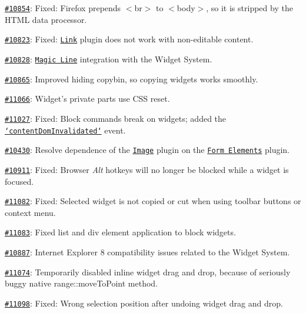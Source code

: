 \begin{DoxyItemize}
\item \href{http://dev.ckeditor.com/ticket/10854}{\tt \#10854}\-: Fixed\-: Firefox prepends {\ttfamily $<$br$>$} to {\ttfamily $<$body$>$}, so it is stripped by the H\-T\-M\-L data processor.
\item \href{http://dev.ckeditor.com/ticket/10823}{\tt \#10823}\-: Fixed\-: \href{http://ckeditor.com/addon/link}{\tt Link} plugin does not work with non-\/editable content.
\item \href{http://dev.ckeditor.com/ticket/10828}{\tt \#10828}\-: \href{http://ckeditor.com/addon/magicline}{\tt Magic Line} integration with the Widget System.
\item \href{http://dev.ckeditor.com/ticket/10865}{\tt \#10865}\-: Improved hiding copybin, so copying widgets works smoothly.
\item \href{http://dev.ckeditor.com/ticket/11066}{\tt \#11066}\-: Widget's private parts use C\-S\-S reset.
\item \href{http://dev.ckeditor.com/ticket/11027}{\tt \#11027}\-: Fixed\-: Block commands break on widgets; added the \href{http://docs.ckeditor.com/#!/api/CKEDITOR.editor-event-contentDomInvalidated}{\tt `content\-Dom\-Invalidated`} event.
\item \href{http://dev.ckeditor.com/ticket/10430}{\tt \#10430}\-: Resolve dependence of the \href{http://ckeditor.com/addon/image}{\tt Image} plugin on the \href{http://ckeditor.com/addon/forms}{\tt Form Elements} plugin.
\item \href{http://dev.ckeditor.com/ticket/10911}{\tt \#10911}\-: Fixed\-: Browser {\itshape Alt} hotkeys will no longer be blocked while a widget is focused.
\item \href{http://dev.ckeditor.com/ticket/11082}{\tt \#11082}\-: Fixed\-: Selected widget is not copied or cut when using toolbar buttons or context menu.
\item \href{http://dev.ckeditor.com/ticket/11083}{\tt \#11083}\-: Fixed list and div element application to block widgets.
\item \href{http://dev.ckeditor.com/ticket/10887}{\tt \#10887}\-: Internet Explorer 8 compatibility issues related to the Widget System.
\item \href{http://dev.ckeditor.com/ticket/11074}{\tt \#11074}\-: Temporarily disabled inline widget drag and drop, because of seriously buggy native {\ttfamily range\-::move\-To\-Point} method.
\item \href{http://dev.ckeditor.com/ticket/11098}{\tt \#11098}\-: Fixed\-: Wrong selection position after undoing widget drag and drop.

\end{DoxyItemize}
